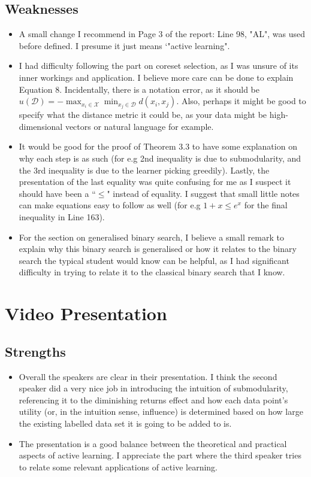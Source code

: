 \documentclass{article}
\begin{document}
\subsection{Weaknesses}
\begin{itemize}
    \item A small change I recommend in Page 3 of the report: Line 98, "AL", was used before defined. I presume it just means `"active learning".
    \item I had difficulty following the part on coreset selection, as I was unsure of its inner workings and application. I believe more care can be done to explain Equation 8. Incidentally, there is a notation error, as it should be $u(\mathcal{D}) = - \max_{x_i \in\mathcal{X}} \min_{x_j \in \mathcal{D}} d(x_i, x_j)$. Also, perhaps it might be good to specify what the distance metric it could be, as your data might be high-dimensional vectors or natural language for example.
    \item It would be good for the proof of Theorem 3.3 to have some explanation on why each step is as such (for e.g 2nd inequality is due to submodularity, and the 3rd inequality is due to the learner picking greedily). Lastly, the presentation of the last equality was quite confusing for me as I suspect it should have been a ``$\leq$" instead of equality. I suggest that small little notes can make equations easy to follow as well (for e.g $1 + x \leq e^x$ for the final inequality in Line 163).
    \item For the section on generalised binary search, I believe a small remark to explain why this binary search is generalised or how it relates to the binary search the typical student would know can be helpful, as I had significant difficulty in trying to relate it to the classical binary search that I know.
\end{itemize}
\section{Video Presentation}
\subsection{Strengths}
\begin{itemize}
    \item Overall the speakers are clear in their presentation. I think the second speaker did a very nice job in introducing the intuition of submodularity, referencing it to the diminishing returns effect and how each data point's utility (or, in the intuition sense, influence) is determined based on how large the existing labelled data set it is going to be added to is.
    \item The presentation is a good balance between the theoretical and practical aspects of active learning. I appreciate the part where the third speaker tries to relate some relevant applications of active learning.
\end{itemize}
\end{document}
